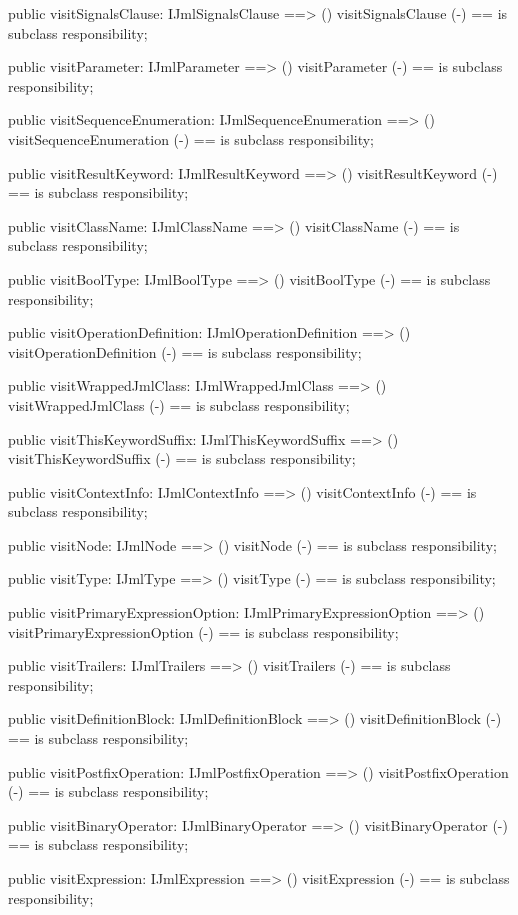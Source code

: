 \begin{vdm_al}
  public visitSignalsClause: IJmlSignalsClause ==> ()
  visitSignalsClause (-) == is subclass responsibility;

  public visitParameter: IJmlParameter ==> ()
  visitParameter (-) == is subclass responsibility;

  public visitSequenceEnumeration: IJmlSequenceEnumeration ==> ()
  visitSequenceEnumeration (-) == is subclass responsibility;

  public visitResultKeyword: IJmlResultKeyword ==> ()
  visitResultKeyword (-) == is subclass responsibility;

  public visitClassName: IJmlClassName ==> ()
  visitClassName (-) == is subclass responsibility;

  public visitBoolType: IJmlBoolType ==> ()
  visitBoolType (-) == is subclass responsibility;

  public visitOperationDefinition: IJmlOperationDefinition ==> ()
  visitOperationDefinition (-) == is subclass responsibility;

  public visitWrappedJmlClass: IJmlWrappedJmlClass ==> ()
  visitWrappedJmlClass (-) == is subclass responsibility;

  public visitThisKeywordSuffix: IJmlThisKeywordSuffix ==> ()
  visitThisKeywordSuffix (-) == is subclass responsibility;

  public visitContextInfo: IJmlContextInfo ==> ()
  visitContextInfo (-) == is subclass responsibility;

  public visitNode: IJmlNode ==> ()
  visitNode (-) == is subclass responsibility;

  public visitType: IJmlType ==> ()
  visitType (-) == is subclass responsibility;

  public visitPrimaryExpressionOption: IJmlPrimaryExpressionOption ==> ()
  visitPrimaryExpressionOption (-) == is subclass responsibility;

  public visitTrailers: IJmlTrailers ==> ()
  visitTrailers (-) == is subclass responsibility;

  public visitDefinitionBlock: IJmlDefinitionBlock ==> ()
  visitDefinitionBlock (-) == is subclass responsibility;

  public visitPostfixOperation: IJmlPostfixOperation ==> ()
  visitPostfixOperation (-) == is subclass responsibility;

  public visitBinaryOperator: IJmlBinaryOperator ==> ()
  visitBinaryOperator (-) == is subclass responsibility;

  public visitExpression: IJmlExpression ==> ()
  visitExpression (-) == is subclass responsibility;


\end{vdm_al}
